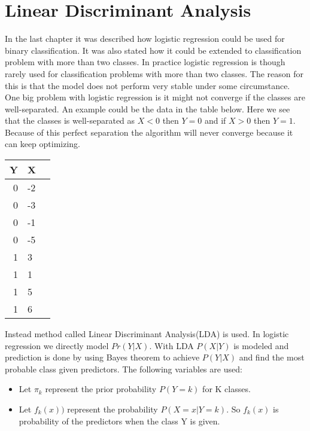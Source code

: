 \chapter{Linear Discriminant Analysis}
\label{chp:lindisana}

In the last chapter it was described how logistic regression could be used for binary classification. It was also stated how it could be extended to  classification problem with more than two classes. In practice logistic regression is though rarely used for classification problems with more than two classes. The reason for this is that the model does not perform very stable under some circumstance. One big problem with logistic regression is it might not converge if the classes are well-separated. An example could be the data in the table below. Here we see that the classes is well-separated as $X<0$ then $Y=0$ and if $X>0$ then $Y=1$. Because of this perfect separation the algorithm will never converge because it can keep optimizing.
\begin{center}
	\begin{tabular}{rll}
		\multicolumn{1}{c}{\textbf{Y}} &
		\multicolumn{1}{c}{\textbf{X}} \\ \hline
		0     &  -2  \\[0.05cm] 
		0     &  -3  \\[0.05cm] 
		0     &  -1  \\[0.05cm] 
		0     &  -5  \\[0.05cm] 
		1     &    3  \\[0.05cm] 
		1     &    1  \\[0.05cm] 
		1     &    5  \\[0.05cm] 
		1     &    6  \\[0.05cm] 
	\end{tabular}
\end{center}

Instead method called Linear Discriminant Analysis(LDA) is used. In logistic regression we directly model $Pr(Y|X)$. With LDA $P(X|Y)$ is modeled and prediction is done by using Bayes theorem to achieve $P(Y|X)$ and find the most probable class given predictors. The following variables are used:

\begin{itemize}
	\item Let $\pi_k$ represent the prior probability $P(Y=k)$ for K classes.
	\item Let $f_k(x))$ represent the probability $P(X=x|Y=k)$. So $f_k(x)$ is probability of the predictors when the class Y is given.
\end{itemize} 

